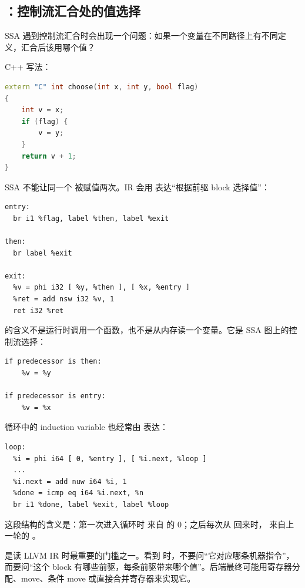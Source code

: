 \subsection{：控制流汇合处的值选择}

SSA 遇到控制流汇合时会出现一个问题：如果一个变量在不同路径上有不同定义，汇合后该用哪个值？

C++ 写法：

\begin{lstlisting}[language=C++]
extern "C" int choose(int x, int y, bool flag)
{
    int v = x;
    if (flag) {
        v = y;
    }
    return v + 1;
}
\end{lstlisting}

SSA 不能让同一个  被赋值两次。IR 会用  表达“根据前驱 block 选择值”：

\begin{lstlisting}
entry:
  br i1 %flag, label %then, label %exit

then:
  br label %exit

exit:
  %v = phi i32 [ %y, %then ], [ %x, %entry ]
  %ret = add nsw i32 %v, 1
  ret i32 %ret
\end{lstlisting}

 的含义不是运行时调用一个函数，也不是从内存读一个变量。它是 SSA 图上的控制流选择：

\begin{lstlisting}
if predecessor is then:
    %v = %y

if predecessor is entry:
    %v = %x
\end{lstlisting}

循环中的 induction variable 也经常由  表达：

\begin{lstlisting}
loop:
  %i = phi i64 [ 0, %entry ], [ %i.next, %loop ]
  ...
  %i.next = add nuw i64 %i, 1
  %done = icmp eq i64 %i.next, %n
  br i1 %done, label %exit, label %loop
\end{lstlisting}

这段结构的含义是：第一次进入循环时  来自  的 0；之后每次从  回来时， 来自上一轮的 。

\begin{mentalmodel}
 是读 LLVM IR 时最重要的门槛之一。看到  时，不要问“它对应哪条机器指令”，而要问“这个 block 有哪些前驱，每条前驱带来哪个值”。后端最终可能用寄存器分配、move、条件 move 或直接合并寄存器来实现它。
\end{mentalmodel}

